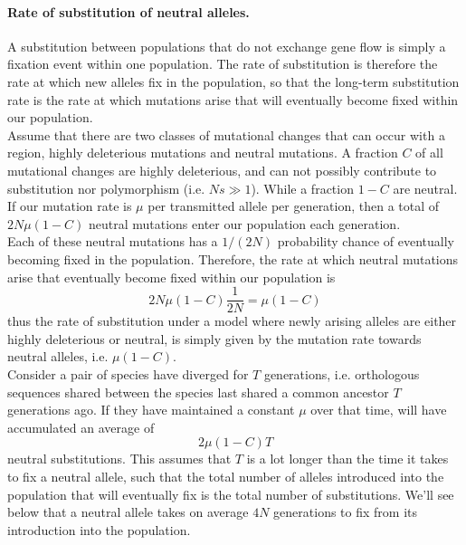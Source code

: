 \paragraph{Rate of substitution of neutral alleles.}

A substitution between populations that do not exchange gene flow is
simply a fixation event within one population. The rate of
substitution is therefore the rate at which new alleles fix in the
population, so that the long-term substitution rate is the rate at
which mutations arise that will eventually become fixed within our population.\\

Assume that there are two classes of mutational changes that can occur with a
region, highly deleterious mutations and neutral mutations. A fraction
$C$ of all mutational changes are highly deleterious, and can not
possibly contribute to substitution nor polymorphism (i.e. $Ns \gg 1$).
While a fraction $1-C$ are neutral. If our mutation rate is $\mu$ per
transmitted allele per generation, then a total of $2N \mu (1-C)$
neutral mutations enter our population each generation.\\

Each of these neutral mutations has a $1/(2N)$ probability chance of
eventually becoming fixed in the population. Therefore, the rate at
which neutral mutations arise that eventually become fixed within our
population is  
\begin{equation}
2N\mu(1-C)\frac{1}{2N} = \mu(1-C)
\end{equation}
thus the rate of substitution under a model where newly arising alleles are either
highly deleterious or neutral, is simply given by the mutation rate
towards neutral alleles, i.e. $\mu(1-C)$.\\

Consider a pair of species have diverged for $T$ generations, i.e. orthologous sequences shared between the species last shared a common ancestor $T$ generations ago. If they have maintained a constant $\mu$ over that time, will have accumulated an average of
\begin{equation}
2\mu(1-C)T
\end{equation}
neutral substitutions. This assumes that $T$ is a lot longer than the time it
takes to fix a neutral allele, such that the total number of 
alleles introduced into the population that will eventually fix is the
total number of substitutions. We'll see below that a neutral allele
takes on average $4N$ generations to fix from its introduction into
the population.\\

